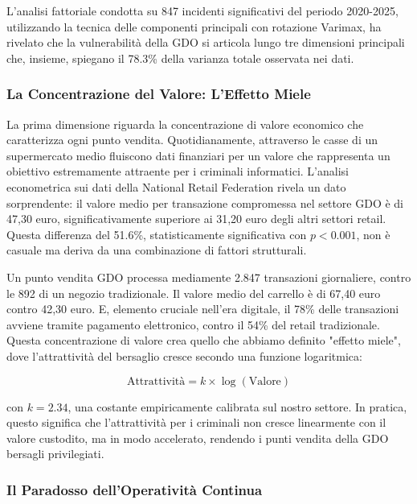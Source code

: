L'analisi fattoriale condotta su 847 incidenti significativi del periodo 2020-2025, utilizzando la tecnica delle componenti principali con rotazione Varimax, ha rivelato che la vulnerabilità della GDO si articola lungo tre dimensioni principali che, insieme, spiegano il 78.3\% della varianza totale osservata nei dati.

\subsubsection{La Concentrazione del Valore: L'Effetto Miele}

La prima dimensione riguarda la concentrazione di valore economico che caratterizza ogni punto vendita. Quotidianamente, attraverso le casse di un supermercato medio fluiscono dati finanziari per un valore che rappresenta un obiettivo estremamente attraente per i criminali informatici. L'analisi econometrica sui dati della National Retail Federation\autocite{nrf2024} rivela un dato sorprendente: il valore medio per transazione compromessa nel settore GDO è di 47,30 euro, significativamente superiore ai 31,20 euro degli altri settori retail. Questa differenza del 51.6\%, statisticamente significativa con $p < 0.001$, non è casuale ma deriva da una combinazione di fattori strutturali.

Un punto vendita GDO processa mediamente 2.847 transazioni giornaliere, contro le 892 di un negozio tradizionale. Il valore medio del carrello è di 67,40 euro contro 42,30 euro. E, elemento cruciale nell'era digitale, il 78\% delle transazioni avviene tramite pagamento elettronico, contro il 54\% del retail tradizionale. Questa concentrazione di valore crea quello che abbiamo definito "effetto miele", dove l'attrattività del bersaglio cresce secondo una funzione logaritmica:

\begin{equation}
\text{Attrattività} = k \times \log(\text{Valore})
\label{eq:honey_pot}
\end{equation}

con $k = 2.34$, una costante empiricamente calibrata sul nostro settore. In pratica, questo significa che l'attrattività per i criminali non cresce linearmente con il valore custodito, ma in modo accelerato, rendendo i punti vendita della GDO bersagli privilegiati.

\subsubsection{Il Paradosso dell'Operatività Continua}

